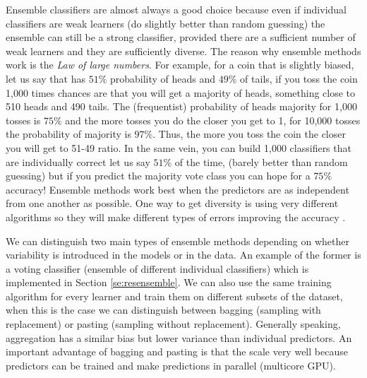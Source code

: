 \documentclass[11pt]{article}
\theoremstyle{definition}
\theoremstyle{remark}
\begin{document}
Ensemble classifiers are almost always a good choice because even if individual classifiers are weak learners (do slightly better than random guessing) the ensemble can still be a strong classifier, provided there are a sufficient number of weak learners and they are sufficiently diverse. %
The reason why ensemble methods work is the \emph{Law of large numbers}. For example, for a coin that is slightly biased, let us say that has $51\%$ probability of heads and $49\%$ of tails, if you toss the coin 1,000 times chances are that you will get a majority of heads, something close to 510 heads and 490 tails. The (frequentist) probability of heads majority for 1,000 tosses is $75\%$ and the more tosses you do the closer you get to 1, for 10,000 tosses the probability of majority is $97\%$. Thus, the more you toss the coin the closer you will get to 51-49 ratio. In the same vein, you can build 1,000 classifiers that are individually correct let us say $51\%$ of the time, (barely better than random guessing) but if you predict the majority vote class you can hope for a $75\%$ accuracy! Ensemble methods work best when the predictors are as independent from one another as possible. One way to get diversity is using very different algorithms so they will make different types of errors improving the accuracy \cite{geron2017hands}. 

We can distinguish two main types of ensemble methods depending on whether variability is introduced in the models or in the data. An example of the former is a voting classifier (ensemble of different individual classifiers) which is implemented in Section \ref{se:resensemble}. We can also use the same training algorithm for every learner and train them on different subsets of the dataset, when this is the case we can distinguish between bagging (sampling with replacement) or pasting (sampling without replacement). 
Generally speaking, aggregation has a similar bias but lower variance than individual predictors. An important advantage of bagging and pasting is that the scale very well because predictors can be trained and make predictions in parallel (multicore GPU).
\end{document}
